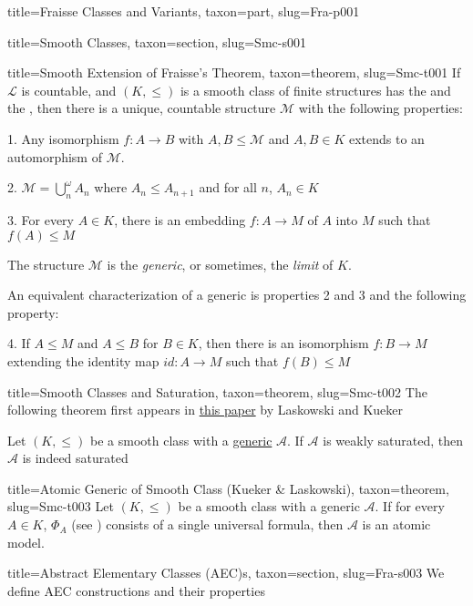 \documentclass[a4paper]{article}
\begin{document}
\begin{tree}{title={Fraisse Classes and Variants}, taxon={part}, slug={Fra-p001}}
\begin{tree}{title={Smooth Classes}, taxon={section}, slug={Smc-s001}}
\begin{tree}{title={Smooth Extension of Fraisse's Theorem}, taxon={theorem}, slug={Smc-t001}}
If \(\mathcal {L}\) is countable, and \((K, \leq )\) is a smooth class of finite structures has the  and the , 
then there is a unique, countable structure \(\mathcal {M}\)  with the following properties:\par{1. Any isomorphism \(f:A \rightarrow  B\) with \(A,B \leq   \mathcal {M}\) and \(A,B \in  K\) extends to
an automorphism of \(\mathcal {M}\).}\par{2. \(\mathcal {M} =  \bigcup ^ \omega _n A_n\) where \(A_n  \leq  A_{n+1}\) and for all \(n\), \(A_n \in  K\)}\par{3. For every \(A \in  K\), there is an embedding \(f:A \rightarrow  M\) of \(A\) into \(M\) such that \(f(A)  \leq  M\)}\par{The structure \(\mathcal {M}\) is the \emph{generic}, or sometimes, the \emph{limit} of \(K\).}\par{An equivalent characterization of a generic is properties 2 and 3 and the following property:}\par{4. If \(A \leq  M\) and \(A \leq  B\) for \(B \in  K\), then there is an isomorphism \(f: B \rightarrow  M\) extending the identity map \(id: A \rightarrow  M\) 
such that \(f(B)  \leq  M\)}
\end{tree}

\begin{tree}{title={Smooth Classes and Saturation}, taxon={theorem}, slug={Smc-t002}}
The following theorem first appears in \href{}{this paper} by Laskowski and Kueker\par{Let \((K,  \leq )\) be a smooth class with a \href{}{generic} \(\mathcal {A}\). If \(\mathcal {A}\) is weakly saturated, then \(\mathcal {A}\) is indeed saturated}
\end{tree}

\begin{tree}{title={Atomic Generic of Smooth Class (Kueker & Laskowski)}, taxon={theorem}, slug={Smc-t003}}
Let \((K, \leq )\) be a smooth class with a generic \(\mathcal {A}\). If for every \(A  \in  K\), \(\Phi _A\) (see ) consists of a single universal formula,
then \(\mathcal {A}\) is an atomic model.
\end{tree}

\end{tree}

\begin{tree}{title={Abstract Elementary Classes (AEC)s}, taxon={section}, slug={Fra-s003}}
We define AEC constructions and their properties
\end{tree}

\end{tree}
\end{document}
